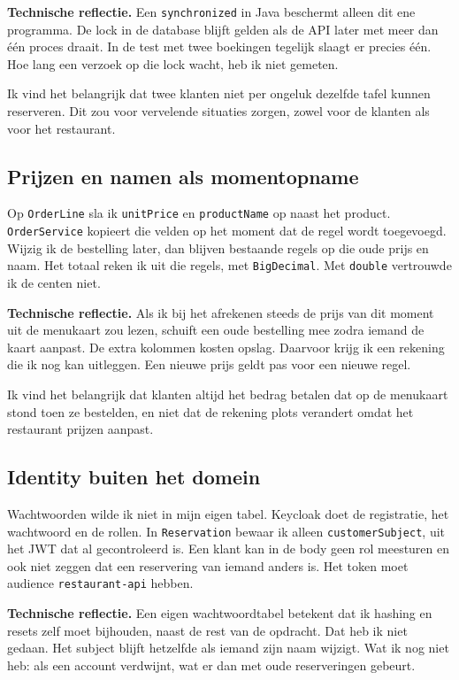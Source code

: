 \documentclass[11pt]{article}
\begin{document}
\textbf{Technische reflectie.} Een \texttt{synchronized} in Java beschermt
alleen dit ene programma. De lock in de database blijft gelden als de API later
met meer dan één proces draait. In de test met twee boekingen tegelijk slaagt
er precies één. Hoe lang een verzoek op die lock wacht, heb ik niet gemeten.

Ik vind het belangrijk dat twee klanten niet per ongeluk dezelfde tafel kunnen
reserveren. Dit zou voor vervelende situaties zorgen, zowel voor de klanten als
voor het restaurant.

\subsection{Prijzen en namen als momentopname}
Op \texttt{OrderLine} sla ik \texttt{unitPrice} en \texttt{productName} op naast
het product. \texttt{OrderService} kopieert die velden op het moment dat de
regel wordt toegevoegd. Wijzig ik de bestelling later, dan blijven bestaande
regels op die oude prijs en naam. Het totaal reken ik uit die regels, met
\texttt{BigDecimal}. Met \texttt{double} vertrouwde ik de centen niet.

\textbf{Technische reflectie.} Als ik bij het afrekenen steeds de prijs van dit
moment uit de menukaart zou lezen, schuift een oude bestelling mee zodra iemand
de kaart aanpast. De extra kolommen kosten opslag. Daarvoor krijg ik een
rekening die ik nog kan uitleggen. Een nieuwe prijs geldt pas voor een nieuwe
regel.

Ik vind het belangrijk dat klanten altijd het bedrag betalen dat op de
menukaart stond toen ze bestelden, en niet dat de rekening plots verandert
omdat het restaurant prijzen aanpast.

\subsection{Identity buiten het domein}
Wachtwoorden wilde ik niet in mijn eigen tabel. Keycloak doet de registratie,
het wachtwoord en de rollen. In \texttt{Reservation} bewaar ik alleen
\texttt{customerSubject}, uit het JWT dat al gecontroleerd is. Een klant kan in
de body geen rol meesturen en ook niet zeggen dat een reservering van iemand
anders is. Het token moet audience \texttt{restaurant-api} hebben.

\textbf{Technische reflectie.} Een eigen wachtwoordtabel betekent dat ik hashing
en resets zelf moet bijhouden, naast de rest van de opdracht. Dat heb ik niet
gedaan. Het subject blijft hetzelfde als iemand zijn naam wijzigt. Wat ik nog
niet heb: als een account verdwijnt, wat er dan met oude reserveringen gebeurt.
\end{document}

